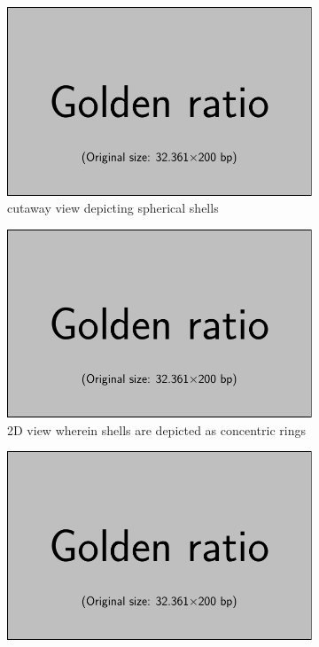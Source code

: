 \begin{figure}[!htbp]
    \centering
    \begin{subfigure}[b]{0.3\textwidth}
        \centering
        \includegraphics{placeholder_images/example-image-golden.pdf}
        \caption{cutaway view depicting spherical shells}
        \label{subfig:radialdisc3d}
    \end{subfigure}
    \hfill
    \begin{subfigure}[b]{0.3\textwidth}
        \centering
        \includegraphics{placeholder_images/example-image-golden.pdf}
        \caption{2D view wherein shells are depicted as concentric rings}
        \label{subfig:radialdisc2d}
    \end{subfigure}
    \hfill
    \begin{subfigure}[b]{0.3\textwidth}
        \centering
        \includegraphics{placeholder_images/example-image-golden.pdf}

\end{subfigure}
\end{figure}
